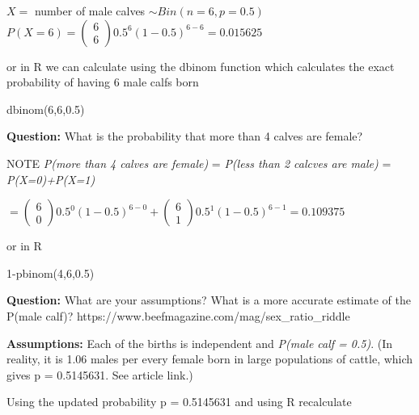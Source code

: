 \documentclass[
  10pt,
  letterpaper,
  DIV=11,
  numbers=noendperiod]{scrartcl}
\newenvironment{Shaded}{\begin{snugshade}}{\end{snugshade}}
\newcommand{\DecValTok}[1]{\textcolor[rgb]{0.68,0.00,0.00}{#1}}
\newcommand{\FloatTok}[1]{\textcolor[rgb]{0.68,0.00,0.00}{#1}}
\newcommand{\FunctionTok}[1]{\textcolor[rgb]{0.28,0.35,0.67}{#1}}
\newcommand{\NormalTok}[1]{\textcolor[rgb]{0.00,0.23,0.31}{#1}}
\newcommand{\SpecialCharTok}[1]{\textcolor[rgb]{0.37,0.37,0.37}{#1}}
\begin{document}
\(X=\) number of male calves \(\sim Bin(n=6,p=0.5)\)
\(P(X=6)=\left(\begin{matrix}6\\6\end{matrix}\right)0.5^6(1-0.5)^{6-6} = 0.015625\)

or in R we can calculate using the dbinom function which calculates the
exact probability of having 6 male calfs born

\begin{Shaded}
\begin{Highlighting}[]
\FunctionTok{dbinom}\NormalTok{(}\DecValTok{6}\NormalTok{,}\DecValTok{6}\NormalTok{,}\FloatTok{0.5}\NormalTok{)}
\end{Highlighting}
\end{Shaded}

\textbf{Question:} What is the probability that more than 4 calves are
female?

NOTE \emph{P(more than 4 calves are female)} = \emph{P(less than 2
calcves are male)} = \emph{P(X=0)+P(X=1)}

\(=\left(\begin{matrix}6\\0\end{matrix}\right)0.5^0(1-0.5)^{6-0}+\left(\begin{matrix}6\\1\end{matrix}\right)0.5^1(1-0.5)^{6-1} = 0.109375\)

or in R

\begin{Shaded}
\begin{Highlighting}[]
\DecValTok{1}\SpecialCharTok{{-}}\FunctionTok{pbinom}\NormalTok{(}\DecValTok{4}\NormalTok{,}\DecValTok{6}\NormalTok{,}\FloatTok{0.5}\NormalTok{)}
\end{Highlighting}
\end{Shaded}

\textbf{Question:} What are your assumptions? What is a more accurate
estimate of the P(male calf)?
https://www.beefmagazine.com/mag/sex\_ratio\_riddle

\textbf{Assumptions:} Each of the births is independent and \emph{P(male
calf = 0.5)}. (In reality, it is 1.06 males per every female born in
large populations of cattle, which gives p = 0.5145631. See article
link.)

Using the updated probability p = 0.5145631 and using R recalculate\\
\end{document}
